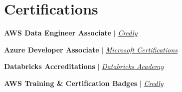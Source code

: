 \documentclass[letterpaper,6pt]{article}
\newcommand{\resumeSubHeadingListStart}{\begin{itemize}[leftmargin=0.15in, label={},partopsep=0.05pt]
\setlength\itemsep{1em}
}
\begin{document}
\section{Certifications}
  \vspace{-15pt}
  \begin{multicols}{2}
\begin{itemize}

    \footnotesize{
    
         \item{
        \textbf{AWS Data Engineer Associate} $|$ \emph{\href{https://www.credly.com/badges/6b158600-d1cb-469c-b0e9-67bfca39ab66/public_url}{\color{blue}Credly}}}{}\\ 
        \item{ 
        \textbf{Azure Developer Associate } $|$ \emph{\href{https://learn.microsoft.com/api/credentials/share/en-us/PratheekKerthivenkata-7946/99E289371AF8C172?sharingId=F942F4410F0E1341}{\color{blue}Microsoft Certifications}}}{}
        \item{
        \textbf{Databricks Accreditations} $|$ \emph{\href{https://scq.io/2GRJ5ku}{\color{blue}Databricks Academy}}}{}\\ 
        \item{
        \textbf{AWS Training \& Certification Badges} $|$ \emph{\href{https://www.credly.com/users/sai-pratheek-k-v-d-s-n-k}{\color{blue}Credly}}}{} \\ 
        


        }

\end{itemize}
  \end{multicols}

\vspace{-18pt}



       
\end{document}
